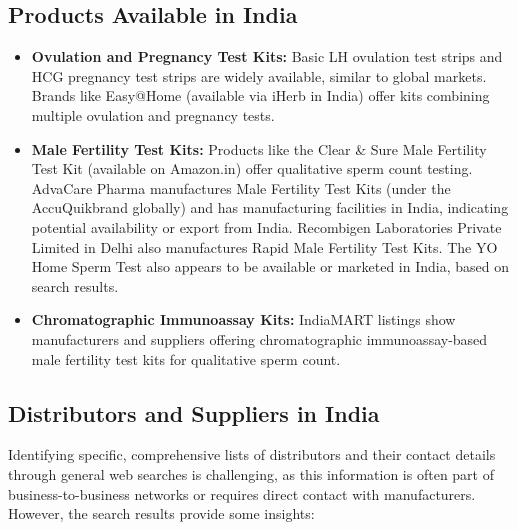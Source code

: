 \documentclass{article}
\begin{document}
\subsection{Products Available in India}
\begin{itemize}
    \item \textbf{Ovulation and Pregnancy Test Kits:} Basic LH ovulation test strips and HCG pregnancy test strips are widely available, similar to global markets. Brands like Easy@Home (available via iHerb in India) offer kits combining multiple ovulation and pregnancy tests.
    \item \textbf{Male Fertility Test Kits:} Products like the Clear \& Sure Male Fertility Test Kit (available on Amazon.in) offer qualitative sperm count testing. AdvaCare Pharma manufactures Male Fertility Test Kits (under the AccuQuik\texttrademark brand globally) and has manufacturing facilities in India, indicating potential availability or export from India. Recombigen Laboratories Private Limited in Delhi also manufactures Rapid Male Fertility Test Kits. The YO Home Sperm Test also appears to be available or marketed in India, based on search results.
    \item \textbf{Chromatographic Immunoassay Kits:} IndiaMART listings show manufacturers and suppliers offering chromatographic immunoassay-based male fertility test kits for qualitative sperm count.
\end{itemize}

\subsection{Distributors and Suppliers in India}
Identifying specific, comprehensive lists of distributors and their contact details through general web searches is challenging, as this information is often part of business-to-business networks or requires direct contact with manufacturers. However, the search results provide some insights:
\end{document}
